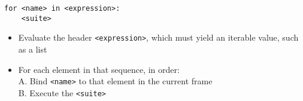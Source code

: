 \begin{lstlisting}
for <name> in <expression>:
	<suite>
\end{lstlisting}

\begin{itemize}
\item Evaluate the header {\tt <expression>}, which must yield an iterable
    value, such as a list
\item For each element in that sequence, in order:\\
A. Bind {\tt <name>} to that element in the current frame\\
B. Execute the {\tt <suite>}
\end{itemize}
